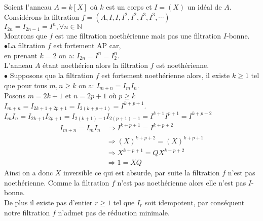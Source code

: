 \begin{monexemple}
	Soient l'anneau $A = k\left[ X\right]$ où $k$ est un corps et $I = (X)$ un idéal de $A$.\\
	Considérons la filtration $f = (A, I, I, I^2, I^2, I^3, I^3, \cdots)$\\
	$I_{2n} = I_{2n-1} = I^n, \forall n \in \mathbb{N}$\\
	Montrons que $f$ est une filtration noethérienne mais pas une filtration $I$-bonne.\\
	$\bullet$La filtration $f$ est fortement AP car, \\en prenant $k = 2$ on a: $I_{2n} = I^n = I_2^n$.\\
	L’anneau $A$ étant noethérien alors la filtration $f$ est noethérienne.\\
	$\bullet$ Supposons que la filtration $f$ est fortement noethérienne alors, il existe $k \geq 1$ tel que pour tous $m, n \geq k$ on a: $I_{m+n} = I_m I_n$.\\
	Posons $m = 2k+1$ et $n = 2p+1$ où $p \geq k$\\
	$I_{m+n} = I_{2k+1+2p+1} = I_{2(k+p+1)} = I^{k+p+1}$.\\
	$I_m I_n =  I_{2k+1}  I_{2p+1} =  I_{2(k+1)-1}  I_{2(p+1)-1} = I^{k+1} I^{p+1} = I^{k+p+2}$
	\begin{align*}
		I_{m+n} = I_m I_n &\Rightarrow I^{k+p+1} = I^{k+p+2}\\
		& \Rightarrow (X)^{k+p+2} = (X)^{k+p+1}\\
		&\Rightarrow X^{k+p+1} = QX^{k+p+2}\\
		&\Rightarrow 1 = XQ
	\end{align*}
	Ainsi on a donc $X$ inversible ce qui est absurde, par suite la filtration $f$ n'est pas noethérienne. Comme la filtration $f$ n'est pas noethérienne alors elle n'est pas $I$-bonne.\\ De plus il existe pas d'entier $r \geq 1$ tel que $I_r$ soit idempotent, par conséquent notre filtration $f$ n'admet pas de réduction minimale.
\end{monexemple}
